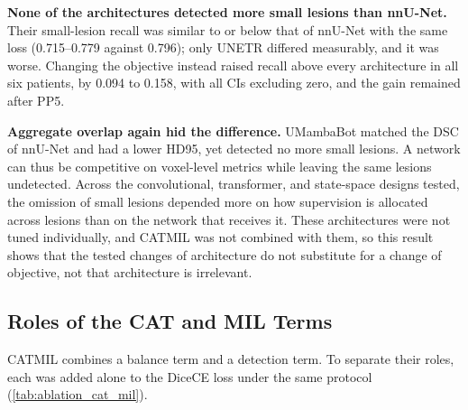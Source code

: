 \textbf{None of the architectures detected more small lesions than
nnU-Net.} Their small-lesion recall was similar to or below that of
nnU-Net with the same loss (0.715--0.779 against 0.796); only UNETR differed
measurably, and it was worse. Changing the objective instead raised recall
above every architecture in all six patients, by 0.094 to 0.158, with all
CIs excluding zero, and the gain remained after PP5.

\textbf{Aggregate overlap again hid the difference.} UMambaBot matched the
DSC of nnU-Net and had a lower HD95, yet detected no more small lesions. A
network can thus be competitive on voxel-level metrics while leaving the
same lesions undetected. Across the convolutional, transformer, and
state-space designs tested, the omission of small lesions depended more on
how supervision is allocated across lesions than on the network that
receives it. These architectures were not tuned individually, and CATMIL
was not combined with them, so this result shows that the tested changes of
architecture do not substitute for a change of objective, not that
architecture is irrelevant.

\subsection{Roles of the CAT and MIL Terms}
\label{sec:ablation}

CATMIL combines a balance term and a detection term. To separate their
roles, each was added alone to the DiceCE loss under the same protocol
(\cref{tab:ablation_cat_mil}).

\begin{table}[t]
\centering
\caption{Ablation of the two CATMIL terms on the MSLesSeg test set without
post-processing. DiceCE\,+\,CAT and DiceCE\,+\,MIL add only one of the two
terms to the base loss. Values are means over the five fold models;
$\Delta$ is the paired difference in small-lesion recall from DiceCE with
95\% patient-level CI; differences whose CI excludes zero are shown in
\textbf{bold}.}
\label{tab:ablation_cat_mil}
\end{table}

